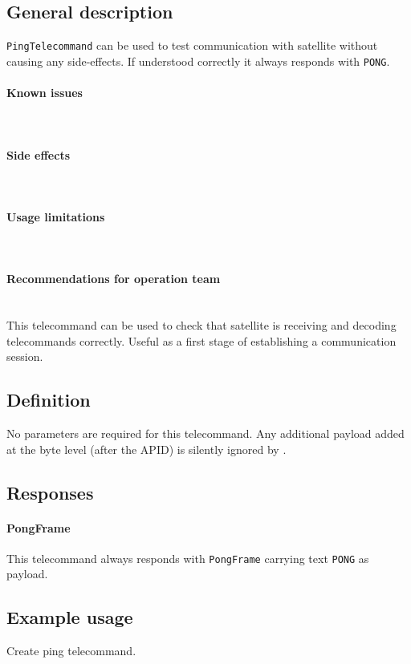 

\subsection{General description}
\texttt{PingTelecommand} can be used to test communication with satellite without causing any side-effects. If understood correctly it always responds with \texttt{PONG}.

\paragraph{Known issues} \mbox{} \\
\None

\paragraph{Side effects} \mbox{} \\
\None

\paragraph{Usage limitations} \mbox{} \\
\None

\paragraph{Recommendations for operation team} \mbox{} \\
This telecommand can be used to check that satellite is receiving and decoding telecommands correctly. Useful as a first stage of establishing a communication session.

\subsection{Definition}

No parameters are required for this telecommand. Any additional payload added at the byte level (after the APID) is silently ignored by \OBC.

\subsection{Responses}

\paragraph{PongFrame}
This telecommand always responds with \texttt{PongFrame} carrying text \texttt{PONG} as payload.

\subsection{Example usage}
Create ping telecommand.

